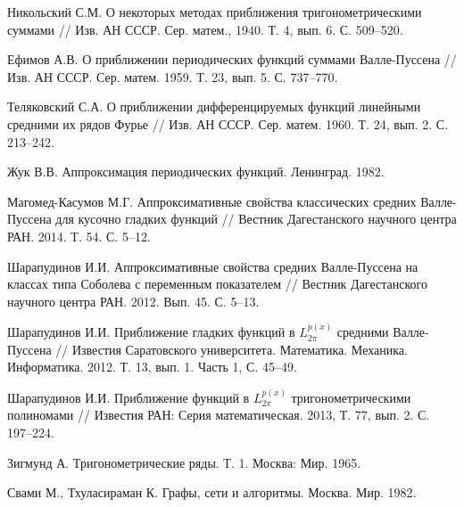 \begin{thebibliography}{1} %





Никольский С.М. О некоторых методах приближения тригонометрическими суммами // Изв. АН СССР. Сер. матем., 1940. Т. 4, вып.  6. С. 509--520.


Ефимов А.В. О приближении периодических функций суммами Валле-Пуссена // Изв. АН СССР. Сер. матем. 1959.  Т. 23, вып. 5. С. 737--770.

Теляковский С.А. О приближении дифференцируемых функций линейными средними их рядов Фурье // Изв. АН СССР. Сер. матем. 1960. Т. 24, вып. 2. С. 213--242.





 Жук В.В. Аппроксимация периодических функций. Ленинград. 1982.


 Магомед-Касумов М.Г. Аппроксимативные свойства классических средних Валле-Пуссена для кусочно гладких функций
// Вестник Дагестанского научного центра РАН. 2014. Т. 54. С. 5--12.






 Шарапудинов И.И. Аппроксимативные свойства средних Валле-Пуссена на классах типа Соболева с переменным показателем // Вестник Дагестанского научного центра РАН. 2012. Вып. 45. С. 5–13.

 Шарапудинов И.И.  Приближение гладких функций в  $L_{2\pi}^{p(x)}$ средними Валле-Пуссена // Известия Саратовского университета. Математика. Механика. Информатика. 2012. Т. 13, вып.  1. Часть 1, С. 45--49.




Шарапудинов И.И. Приближение функций в $L^{p(x)}_{2\pi}$ тригонометрическими полиномами // Известия РАН: Серия математическая. 2013, Т. 77, вып. 2. С. 197--224.




 Зигмунд А. Тригонометрические ряды. Т. 1. Москва: Мир. 1965.




Свами М., Тхуласираман К. Графы, сети и алгоритмы. Москва. Мир. 1982.


\end{thebibliography}
